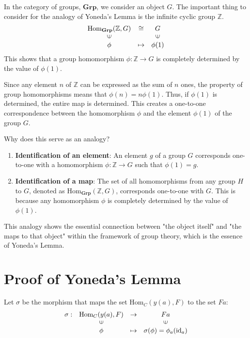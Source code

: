 \documentclass[uplatex,a4j,12pt,dvipdfmx]{jsarticle}
\begin{document}
In the category of groups, $\mathbf{Grp}$, we consider an object $G$. The important thing to consider for the analogy of Yoneda's Lemma is the infinite cyclic group $\mathbb{Z}$.
\[
	\begin{array}{ccc} \text{Hom}_{\mathbf{Grp}}(\mathbb{Z}, G)& \cong & G \\ \rotatebox{90}{${\in}$} && \rotatebox{90}{${\in}$} \\ \phi& \mapsto & \phi(1) \end{array}
\]
This shows that a group homomorphism $\phi: \mathbb{Z} \to G$ is completely determined by the value of $\phi(1)$.

Since any element $n$ of $\mathbb{Z}$ can be expressed as the sum of $n$ ones, the property of group homomorphisms means that $\phi(n) = n\phi(1)$. Thus, if $\phi(1)$ is determined, the entire map is determined. This creates a one-to-one correspondence between the homomorphism $\phi$ and the element $\phi(1)$ of the group $G$.

Why does this serve as an analogy?

\begin{enumerate}
	\item \textbf{Identification of an element}: An element $g$ of a group $G$ corresponds one-to-one with a homomorphism $\phi: \mathbb{Z} \to G$ such that $\phi(1) = g$.
	\item \textbf{Identification of a map}: The set of all homomorphisms from any group $H$ to $G$, denoted as $\text{Hom}_{\mathbf{Grp}}(\mathbb{Z}, G)$, corresponds one-to-one with $G$. This is because any homomorphism $\phi$ is completely determined by the value of $\phi(1)$.
\end{enumerate}

This analogy shows the essential connection between "the object itself" and "the maps to that object" within the framework of group theory, which is the essence of Yoneda's Lemma.









\section{Proof of Yoneda's Lemma}

Let $\sigma$ be the morphism that maps the set $\text{Hom}_{C}(y(a),F)$ to the set $Fa$:
\[
	\begin{array}{cccc}
		\sigma : & \text{Hom}_{C}(y(a),F)  & \to     & Fa                                     \\
		         & \rotatebox{90}{${\in}$} &         & \rotatebox{90}{${\in}$}                \\
		         & \phi                    & \mapsto & \sigma(\phi) = \phi_{a}(\text{id}_{a})
	\end{array}
\]
\end{document}
